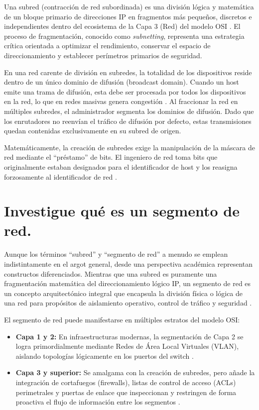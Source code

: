 \documentclass[a4paper,12pt]{article}
\begin{document}
Una subred (contracción de red subordinada) es una división lógica y matemática de un bloque primario de direcciones IP en fragmentos más pequeños, discretos e independientes dentro del ecosistema de la Capa 3 (Red) del modelo OSI \cite{lenovo_netmask}. El proceso de fragmentación, conocido como \textit{subnetting}, representa una estrategia crítica orientada a optimizar el rendimiento, conservar el espacio de direccionamiento y establecer perímetros primarios de seguridad.

En una red carente de división en subredes, la totalidad de los dispositivos reside dentro de un único dominio de difusión (broadcast domain). Cuando un host emite una trama de difusión, esta debe ser procesada por todos los dispositivos en la red, lo que en redes masivas genera congestión \cite{tmobile_subnet}. Al fraccionar la red en múltiples subredes, el administrador segmenta los dominios de difusión. Dado que los enrutadores no reenvían el tráfico de difusión por defecto, estas transmisiones quedan contenidas exclusivamente en su subred de origen. 

Matemáticamente, la creación de subredes exige la manipulación de la máscara de red mediante el ``préstamo'' de bits. El ingeniero de red toma bits que originalmente estaban designados para el identificador de host y los reasigna forzosamente al identificador de red \cite{lenovo_netmask}.

\newpage

\section{Investigue qué es un segmento de red.}

Aunque los términos ``subred'' y ``segmento de red'' a menudo se emplean indistintamente en el argot general, desde una perspectiva académica representan constructos diferenciados. Mientras que una subred es puramente una fragmentación matemática del direccionamiento lógico IP, un segmento de red es un concepto arquitectónico integral que encapsula la división física o lógica de una red para propósitos de aislamiento operativo, control de tráfico y seguridad \cite{paloalto_segmentation}.

El segmento de red puede manifestarse en múltiples estratos del modelo OSI:
\begin{itemize}
    \item \textbf{Capa 1 y 2:} En infraestructuras modernas, la segmentación de Capa 2 se logra primordialmente mediante Redes de Área Local Virtuales (VLAN), aislando topologías lógicamente en los puertos del switch \cite{paloalto_segmentation}.
    \item \textbf{Capa 3 y superior:} Se amalgama con la creación de subredes, pero añade la integración de cortafuegos (firewalls), listas de control de acceso (ACLs) perimetrales y puertas de enlace que inspeccionan y restringen de forma proactiva el flujo de información entre los segmentos \cite{zscaler_segmentation}.
\end{itemize}
\end{document}
